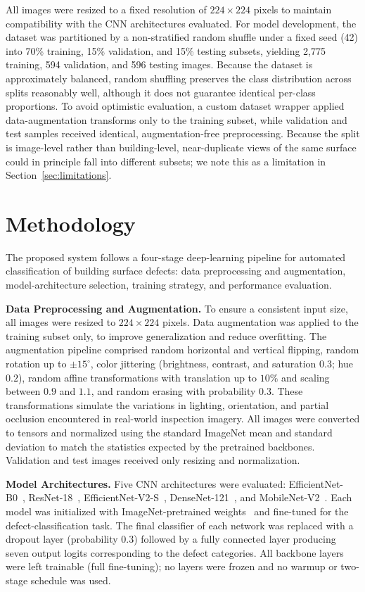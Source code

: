 \documentclass[conference]{IEEEtran}
\begin{document}
All images were resized to a fixed resolution of $224\times224$ pixels to maintain compatibility with the CNN architectures evaluated. For model development, the dataset was partitioned by a non-stratified random shuffle under a fixed seed (42) into 70\% training, 15\% validation, and 15\% testing subsets, yielding 2{,}775 training, 594 validation, and 596 testing images. Because the dataset is approximately balanced, random shuffling preserves the class distribution across splits reasonably well, although it does not guarantee identical per-class proportions. To avoid optimistic evaluation, a custom dataset wrapper applied data-augmentation transforms only to the training subset, while validation and test samples received identical, augmentation-free preprocessing. Because the split is image-level rather than building-level, near-duplicate views of the same surface could in principle fall into different subsets; we note this as a limitation in Section~\ref{sec:limitations}.

\section{Methodology}
The proposed system follows a four-stage deep-learning pipeline for automated classification of building surface defects: data preprocessing and augmentation, model-architecture selection, training strategy, and performance evaluation.

\textbf{Data Preprocessing and Augmentation.}
To ensure a consistent input size, all images were resized to $224\times224$ pixels. Data augmentation was applied to the training subset only, to improve generalization and reduce overfitting. The augmentation pipeline comprised random horizontal and vertical flipping, random rotation up to $\pm15^{\circ}$, color jittering (brightness, contrast, and saturation $0.3$; hue $0.2$), random affine transformations with translation up to $10\%$ and scaling between $0.9$ and $1.1$, and random erasing with probability $0.3$. These transformations simulate the variations in lighting, orientation, and partial occlusion encountered in real-world inspection imagery. All images were converted to tensors and normalized using the standard ImageNet mean and standard deviation to match the statistics expected by the pretrained backbones. Validation and test images received only resizing and normalization.

\textbf{Model Architectures.}
Five CNN architectures were evaluated: EfficientNet-B0~\cite{ref27}, ResNet-18~\cite{ref24}, EfficientNet-V2-S~\cite{ref28}, DenseNet-121~\cite{ref25}, and MobileNet-V2~\cite{ref26}. Each model was initialized with ImageNet-pretrained weights~\cite{ref23} and fine-tuned for the defect-classification task. The final classifier of each network was replaced with a dropout layer (probability $0.3$) followed by a fully connected layer producing seven output logits corresponding to the defect categories. All backbone layers were left trainable (full fine-tuning); no layers were frozen and no warmup or two-stage schedule was used.
\end{document}
